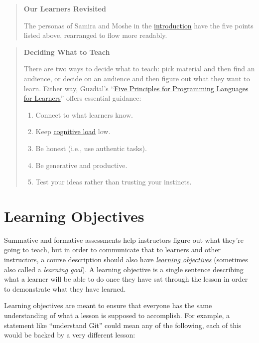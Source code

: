 \documentclass[10pt,statementpaper]{memoir}
\providecommand{\tightlist}{%
  \setlength{\itemsep}{0pt}\setlength{\parskip}{0pt}}
\begin{document}
\begin{quote}
\textbf{Our Learners Revisited}

The personas of Samira and Moshe in the \href{index.html}{introduction}
have the five points listed above, rearranged to flow more readably.
\end{quote}

\begin{quote}
\textbf{Deciding What to Teach}

There are two ways to decide what to teach: pick material and then find
an audience, or decide on an audience and then figure out what they want
to learn. Either way, Guzdial's
``\href{biblio.html\#guzdial-principles}{Five Principles for Programming
Languages for Learners}'' offers essential guidance:

\begin{enumerate}
\def\labelenumi{\arabic{enumi}.}
\tightlist
\item
  Connect to what learners know.
\item
  Keep \href{load.html}{cognitive load} low.
\item
  Be honest (i.e., use authentic tasks).
\item
  Be generative and productive.
\item
  Test your ideas rather than trusting your instincts.
\end{enumerate}
\end{quote}

\section{Learning Objectives}\label{learning-objectives}

Summative and formative assessments help instructors figure out what
they're going to teach, but in order to communicate that to learners and
other instructors, a course description should also have
\emph{\href{gloss.html\#learning-objective}{learning objectives}}
(sometimes also called a \emph{learning goal}). A learning objective is
a single sentence describing what a learner will be able to do once they
have sat through the lesson in order to demonstrate what they have
learned.

Learning objectives are meant to ensure that everyone has the same
understanding of what a lesson is supposed to accomplish. For example, a
statement like ``understand Git'' could mean any of the following, each
of this would be backed by a very different lesson:
\end{document}
